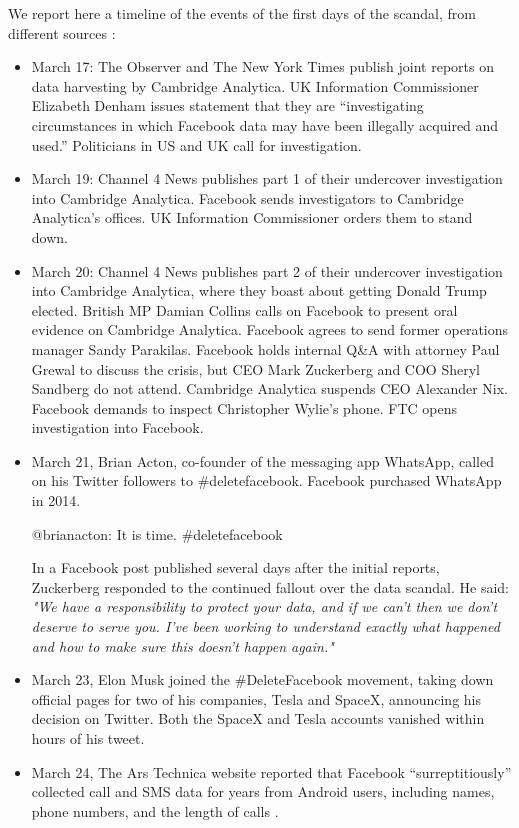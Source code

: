 \documentclass[11pt, twoside]{report}
\begin{document}
We report here a timeline of the events of the first days of the scandal, from different sources \cite{nyt_timeline}:
\begin{itemize}

\item March 17: The Observer and The New York Times publish joint reports on data harvesting by Cambridge Analytica. UK Information Commissioner Elizabeth Denham issues statement that they are “investigating circumstances in which Facebook data may have been illegally acquired and used.” Politicians in US and UK call for investigation.

\item March 19: Channel 4 News publishes part 1 of their undercover investigation into Cambridge Analytica. Facebook sends investigators to Cambridge Analytica’s offices. UK Information Commissioner orders them to stand down. \cite{channel4}

\item March 20: Channel 4 News publishes part 2 of their undercover investigation into Cambridge Analytica, where they boast about getting Donald Trump elected. British MP Damian Collins calls on Facebook to present oral evidence on Cambridge Analytica. Facebook agrees to send former operations manager Sandy Parakilas. Facebook holds internal Q\&A with attorney Paul Grewal to discuss the crisis, but CEO Mark Zuckerberg and COO Sheryl Sandberg do not attend. Cambridge Analytica suspends CEO Alexander Nix. Facebook demands to inspect Christopher Wylie’s phone. FTC opens investigation into Facebook.
\item March 21,
  Brian Acton, co-founder of the messaging app WhatsApp, called on his Twitter followers to \#deletefacebook. Facebook purchased WhatsApp in 2014.
  \begin{center}
  @brianacton: It is time. \#deletefacebook\\    
  \end{center}
In a Facebook post published several days after the initial reports, Zuckerberg responded to the continued fallout over the data scandal.
He said:\\
\textit{"We have a responsibility to protect your data, and if we can't then we don't deserve to serve you. I've been working to understand exactly what happened and how to make sure this doesn't happen again."}  
\item March 23,
  Elon Musk joined the \#DeleteFacebook movement, taking down official pages for two of his companies, Tesla and SpaceX, announcing his decision on Twitter. Both the SpaceX and Tesla accounts vanished within hours of his tweet.
\item March 24, 
  The Ars Technica website reported that Facebook ``surreptitiously'' collected call and SMS data for years from Android users, including names, phone numbers, and the length of calls \cite{ars_technica}.
\end{itemize}
\end{document}
